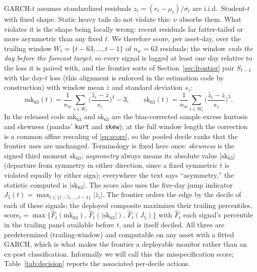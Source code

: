\documentclass[11pt]{article}
\theoremstyle{remark}
\begin{document}
GARCH-$t$ assumes standardized residuals $z_t = (r_t - \mu_t)/\sigma_t$
are i.i.d.\ Student-$t$ with fixed shape. Static heavy tails do not violate this: $\nu$ absorbs them. What violates it is the shape being
locally wrong: recent residuals far fatter-tailed or more
asymmetric than any fixed $t$. We therefore score, per asset-day, over
the trailing window $W_t = \{t-63,\dots,t-1\}$ of $n_w = 63$ residuals; the window \emph{ends the day before the forecast target}, so every signal is lagged at least one day relative to the loss it is paired with, and the frontier sorts of Section~\ref{sec:frontier} pair $S_{t-1}$ with the day-$t$ loss (this alignment is enforced in the estimation code by construction)
with window mean $\bar{z}$ and standard deviation $s_z$:
\begin{equation}
\mathrm{mk}_{63}(t) = \frac{1}{n_w}\sum_{i\in W_t}
\Big(\frac{\widehat{z}_i - \bar{z}}{s_z}\Big)^{4} - 3,
\qquad
\mathrm{sk}_{63}(t) = \frac{1}{n_w}\sum_{i\in W_t}
\Big(\frac{\widehat{z}_i - \bar{z}}{s_z}\Big)^{3},
\label{eq:score}
\end{equation}
In the released code $\mathrm{mk}_{63}$ and $\mathrm{sk}_{63}$ are the
bias-corrected sample excess kurtosis and skewness (pandas' \texttt{kurt}
and \texttt{skew}); at the full window length the correction is a common
affine rescaling of \eqref{eq:score}, so the pooled decile ranks that the
frontier uses are unchanged.
Terminology is fixed here once: \emph{skewness} is the signed third
moment $\mathrm{sk}_{63}$; \emph{asymmetry} always means its absolute
value $|\mathrm{sk}_{63}|$ (departure from symmetry in either
direction, since a fixed symmetric $t$ is violated equally by either
sign); everywhere the text says ``asymmetry,'' the statistic computed
is $|\mathrm{sk}_{63}|$. The score also uses the five-day jump indicator
$J_5(t) = \max_{i \in \{t-5,\dots,t-1\}} |\widehat{z}_i|$. The frontier
orders the edge by the decile of each of these signals; the deployed
composite maximizes their trailing percentiles,
$\mathrm{score}_t=\max\{\widehat{F}_t(\mathrm{mk}_{63}),\,
\widehat{F}_t(|\mathrm{sk}_{63}|),\,\widehat{F}_t(J_5)\}$ with
$\widehat{F}_t$ each signal's percentile in the trailing panel available
before $t$, and is itself deciled.
All three are predetermined (trailing-window) and computable on any asset with a fitted GARCH, which is what makes the frontier a deployable monitor
rather than an ex-post classification. Informally we will call this the
misspecification score; Table~\ref{tab:decision} reports the associated
per-decile actions.
\end{document}
